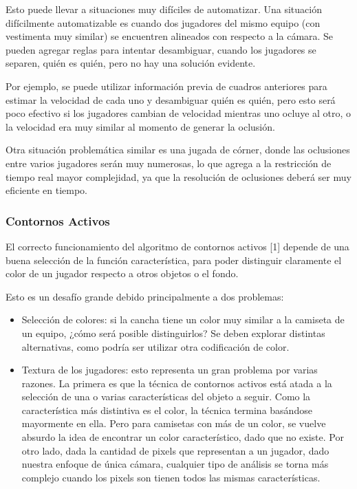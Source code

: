 \documentclass[a4paper,10pt]{article}
\begin{document}
Esto puede llevar a situaciones muy difíciles de automatizar. Una situación
difícilmente automatizable es cuando dos jugadores del mismo equipo (con
vestimenta muy similar) se encuentren alineados con respecto a la cámara.
Se pueden agregar reglas para intentar desambiguar, cuando los jugadores se
separen, quién es quién, pero no hay una solución evidente.

Por ejemplo, se puede utilizar información previa de cuadros anteriores para
estimar la velocidad de cada uno y desambiguar quién es quién, pero esto
será poco efectivo si los jugadores cambian de velocidad mientras uno ocluye
al otro, o la velocidad era muy similar al momento de generar la oclusión.

Otra situación problemática similar es una jugada de córner, donde las
oclusiones entre varios jugadores serán muy numerosas, lo que agrega a la
restricción de tiempo real mayor complejidad, ya que la resolución de
oclusiones deberá ser muy eficiente en tiempo.

\subsubsection{Contornos Activos}

El correcto funcionamiento del algoritmo de contornos activos [1] depende
de una buena selección de la función característica, para poder distinguir
claramente el color de un jugador respecto a otros objetos o el fondo.

Esto es un desafío grande debido principalmente a dos problemas:
\begin{itemize}

\item Selección de colores: si la cancha tiene un color muy similar a la
  camiseta de un equipo, ¿cómo será posible distinguirlos? Se deben explorar
  distintas alternativas, como podría ser utilizar otra codificación de color.

\item Textura de los jugadores: esto representa un gran problema por varias
  razones. La primera es que la técnica de contornos activos está atada a la
  selección de una o varias características del objeto a seguir. Como la
  característica más distintiva es el color, la técnica termina basándose
  mayormente en ella. Pero para camisetas con más de un color, se vuelve
  absurdo la idea de encontrar un color característico, dado que no existe. Por
  otro lado, dada la cantidad de pixels que representan a un jugador, dado
  nuestra enfoque de única cámara, cualquier tipo de análisis se torna más
  complejo cuando los pixels son tienen todos las mismas características.

\end{itemize}
\end{document}
